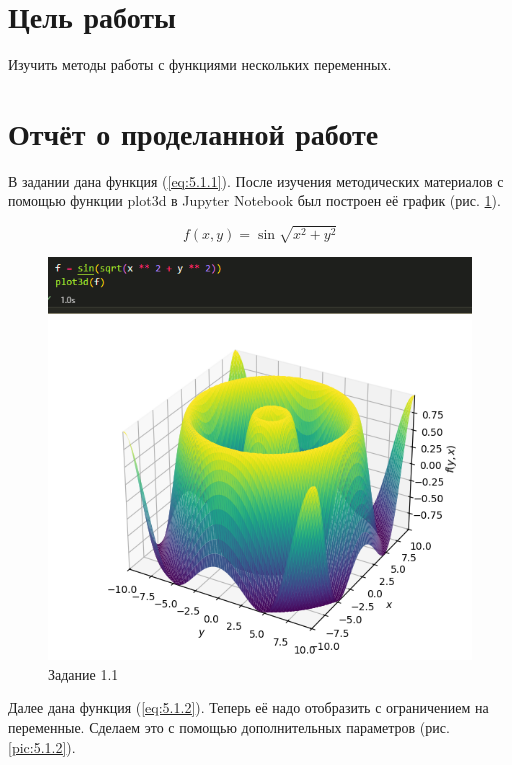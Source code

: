 \documentclass[14pt,a4paper]{extarticle}
\begin{document}


\section*{Цель работы}
        Изучить методы работы с функциями нескольких переменных.


\section*{Отчёт о проделанной работе}
В задании дана функция (\ref{eq:5.1.1}). После изучения методических материалов
с помощью функции plot3d в Jupyter Notebook был построен её график
(рис. \ref{pic:5.1.1}).

\begin{equation}\label{eq:5.1.1}
    f(x, y) = \sin{\sqrt{x^2 + y^2}}
\end{equation}
\begin{figure}[ht!]
    \centering
    \includegraphics[width=0.6\linewidth]{figures/5.1/1.png}
    \caption{Задание 1.1}
    \label{pic:5.1.1}
\end{figure}
\newpage

        Далее дана функция (\ref{eq:5.1.2}). Теперь её надо
отобразить с ограничением на переменные. Сделаем это с помощью
дополнительных параметров (рис. \ref{pic:5.1.2}).
\end{document}
